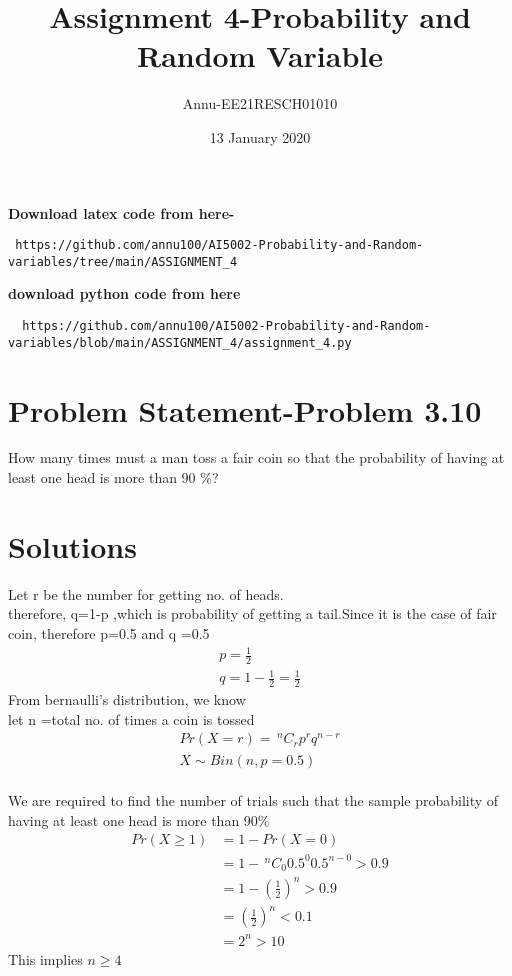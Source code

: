 \documentclass[journel,12pt,twocoloums]{IEEEtran}
\title{Assignment 4-Probability and Random Variable}
\author{Annu-EE21RESCH01010}
\date{13 January 2020}
\providecommand{\nCr}[2]{\,^{#1}C_{#2}}
\begin{document}
 \maketitle
\textbf{Download latex code from here-}\\
\begin{lstlisting}
 https://github.com/annu100/AI5002-Probability-and-Random-variables/tree/main/ASSIGNMENT_4
 \end{lstlisting}
 \textbf{download python code from here}\\
 \begin{lstlisting}
  https://github.com/annu100/AI5002-Probability-and-Random-variables/blob/main/ASSIGNMENT_4/assignment_4.py
 \end{lstlisting}
 \section{Problem Statement-Problem 3.10}
How many times must a man toss a fair coin
so that the probability of having at least one
head is more than 90 \%?
\section{Solutions}

Let r be the number for getting no. of  heads. \\
therefore, q=1-p ,which is probability of getting a tail.Since it is the case of fair coin, therefore p=0.5 and q =0.5\\
\begin{align}
    p=\frac{1}{2} \\
    q=1-\frac{1}{2}=\frac{1}{2}
\end{align}
From bernaulli's distribution, we know\\
let n =total no. of times a coin is tossed\\
\begin{align}
    Pr(X=r)= \nCr{n}{r} p^r q^{n-r}  \\
    X \sim Bin(n,p=0.5)
\end{align}\\

We are required to find the number of trials such that the sample  probability of having at least one
head is more than 90\%\\
\begin{align}
    Pr(X \ge 1) &=1-Pr(X=0)\\
                &=1-\nCr{n}{0} 0.5^0 0.5^{n-0} >0.9 \\
                &=1-(\frac{1}{2})^n >0.9\\
                &=(\frac{1}{2})^n < 0.1\\
                &= 2^{n} >10
\end{align}
This implies $n \ge 4$
\end{document}
